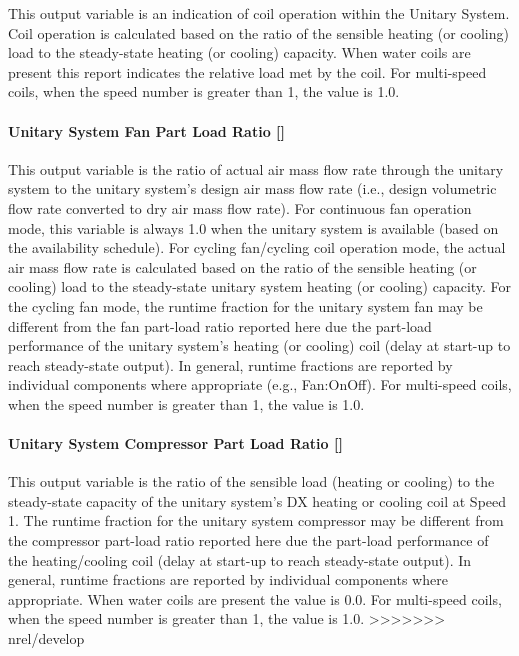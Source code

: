 This output variable is an indication of coil operation within the Unitary System. Coil operation is calculated based on the ratio of the sensible heating (or cooling) load to the steady-state heating (or cooling) capacity. When water coils are present this report indicates the relative load met by the coil. For multi-speed coils, when the speed number is greater than 1, the value is 1.0.

\paragraph{Unitary System Fan Part Load Ratio {[]}}\label{unitary-system-fan-part-load-ratio}

This output variable is the ratio of actual air mass flow rate through the unitary system to the unitary system's design air mass flow rate (i.e., design volumetric flow rate converted to dry air mass flow rate). For continuous fan operation mode, this variable is always 1.0 when the unitary system is available (based on the availability schedule). For cycling fan/cycling coil operation mode, the actual air mass flow rate is calculated based on the ratio of the sensible heating (or cooling) load to the steady-state unitary system heating (or cooling) capacity. For the cycling fan mode, the runtime fraction for the unitary system fan may be different from the fan part-load ratio reported here due the part-load performance of the unitary system's heating (or cooling) coil (delay at start-up to reach steady-state output). In general, runtime fractions are reported by individual components where appropriate (e.g., Fan:OnOff). For multi-speed coils, when the speed number is greater than 1, the value is 1.0.

\paragraph{Unitary System Compressor Part Load Ratio {[]}}\label{unitary-system-compressor-part-load-ratio}

This output variable is the ratio of the sensible load (heating or cooling) to the steady-state capacity of the unitary system's DX heating or cooling coil at Speed 1. The runtime fraction for the unitary system compressor may be different from the compressor part-load ratio reported here due the part-load performance of the heating/cooling coil (delay at start-up to reach steady-state output). In general, runtime fractions are reported by individual components where appropriate. When water coils are present the value is 0.0. For multi-speed coils, when the speed number is greater than 1, the value is 1.0.
>>>>>>> nrel/develop

